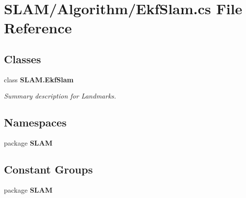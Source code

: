 \section{S\-L\-A\-M/\-Algorithm/\-Ekf\-Slam.cs File Reference}
\label{_ekf_slam_8cs}
\subsection*{Classes}
\begin{DoxyCompactItemize}
\item 
class {\bf S\-L\-A\-M.\-Ekf\-Slam}
\begin{DoxyCompactList}\small\item\em Summary description for Landmarks. \end{DoxyCompactList}\end{DoxyCompactItemize}
\subsection*{Namespaces}
\begin{DoxyCompactItemize}
\item 
package {\bf S\-L\-A\-M}
\end{DoxyCompactItemize}
\subsection*{Constant Groups}
\begin{DoxyCompactItemize}
\item 
package {\bf S\-L\-A\-M}
\end{DoxyCompactItemize}
